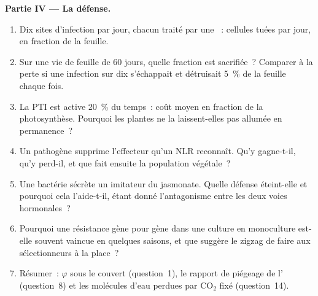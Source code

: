 \begin{problem}
\medskip
\noindent\textbf{Partie IV --- La défense.}
\begin{enumerate}[resume]
  \item Dix sites d'infection par jour, chacun traité par une ~: cellules tuées par jour, en fraction de la
        feuille.
  \item Sur une vie de feuille de 60 jours, quelle fraction est
        sacrifiée~? Comparer à la perte si une infection sur dix
        s'échappait et détruisait \qty{5}{\%} de la feuille chaque fois.
  \item La PTI est active \qty{20}{\%} du temps~: coût moyen en fraction
        de la photosynthèse. Pourquoi les plantes ne la laissent-elles
        pas allumée en permanence~?
  \item Un pathogène supprime l'effecteur qu'un NLR reconnaît. Qu'y
        gagne-t-il, qu'y perd-il, et que fait ensuite la population
        végétale~?
  \item Une bactérie sécrète un imitateur du jasmonate. Quelle défense
        éteint-elle et pourquoi cela l'aide-t-il, étant donné
        l'antagonisme entre les deux voies hormonales~?
  \item Pourquoi une résistance gène pour gène dans une culture en
        monoculture est-elle souvent vaincue en quelques saisons, et que
        suggère le zigzag de faire aux sélectionneurs à la place~?
  \item Résumer~: $\varphi$ sous le couvert (question~1), le rapport de
        piégeage de l' (question~8) et les molécules d'eau perdues
        par CO$_{2}$ fixé (question~14).
\end{enumerate}
\end{problem}
